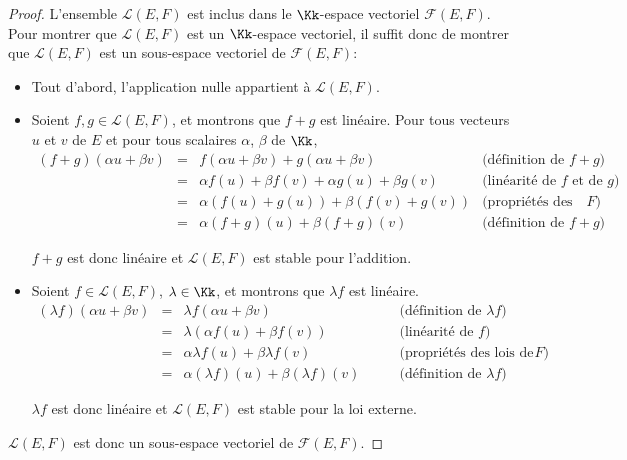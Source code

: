 \documentclass[class=report,crop=false]{standalone}
\begin{document}
\begin{proof}
L'ensemble  $\mathcal{L}(E,F)$ est inclus dans le $\Kk$-espace vectoriel $\mathcal{F}(E,F)$.
Pour montrer que $\mathcal{L}(E,F)$ est un $\Kk$-espace vectoriel, il suffit donc de montrer que
$\mathcal{L}(E,F)$ est un sous-espace vectoriel de  $\mathcal{F}(E,F)$:

\begin{itemize}
  \item Tout d'abord, l'application nulle appartient à $\mathcal{L}(E,F)$.

  \item Soient $f, g \in \mathcal{L}(E,F)$, et montrons que $f+g$ est linéaire.
   Pour tous vecteurs
$u$ et $v$ de $E$ et pour tous scalaires $\alpha$, $\beta$ de $\Kk$,
{\small
$$\begin{array}{rclr}
(f+g)(\alpha u +\beta v)
  & = &f(\alpha u+ \beta v) +g(\alpha u +\beta v) & \text{(définition de $f+g$)} \\
  & = & \alpha f(u)+\beta f(v)+\alpha g(u)+ \beta g(v) & \text{(linéarité de  $f$ et de $g$)}\\
  & = & \alpha \left ( f(u)+g(u) \right )+\beta \left (f(v)+g(v)\right ) & \!\!\text{(propriétés des lois de $F$)}\\
  & = & \alpha (f+g)(u)+\beta (f+g)(v) & \text{(définition de $f+g$)}
\end{array}$$
}

  $f+g$ est donc linéaire et  $\mathcal{L}(E,F)$  est stable pour l'addition.

  \item  Soient $f \in \mathcal{L}(E,F)$, $\lambda \in \Kk$, et montrons que $\lambda f$ est linéaire.
{\small
$$\begin{array}{rclr}
(\lambda f)(\alpha u + \beta v)
   & = & \lambda f(\alpha u + \beta v)  &\qquad \text{(définition de $\lambda f$)}\\
   & = &  \lambda \left ( \alpha f(u)+\beta f(v) \right ) &\qquad \text{(linéarité de $f$)}\\
   & = & \alpha \lambda f(u)+ \beta \lambda f(v) &\qquad \text{(propriétés des lois de $F$)}\\
   & = & \alpha (\lambda f)(u)+ \beta (\lambda f)(v) &\qquad \text{(définition de $\lambda f$)}
\end{array}$$
}

$\lambda f$  est donc linéaire et $\mathcal{L}(E,F)$ est stable pour la loi externe.

\end{itemize}
$\mathcal{L}(E,F)$ est donc un sous-espace vectoriel de $\mathcal{F}(E,F)$.
\end{proof}
\end{document}
